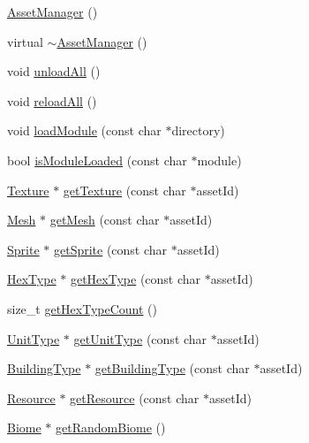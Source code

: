 \begin{DoxyCompactItemize}
\item 
\hyperlink{class_asset_manager_a750ae7b39b633fbb6594443aa3ca704b}{Asset\+Manager} ()
\item 
virtual \hyperlink{class_asset_manager_a9c89817cbf3516f1451c116e89f47d30}{$\sim$\+Asset\+Manager} ()
\item 
void \hyperlink{class_asset_manager_a34c0028e4cfb8e23642f161c1369cd56}{unload\+All} ()
\item 
void \hyperlink{class_asset_manager_ad6a75fed1cd03286eae6bb12a5a5d3d3}{reload\+All} ()
\item 
void \hyperlink{class_asset_manager_aeb708c02a513a57e9c1ac5351b3f2fa5}{load\+Module} (const char $\ast$directory)
\item 
bool \hyperlink{class_asset_manager_a2ef6d83cab64a6f6e57dd9b19c845318}{is\+Module\+Loaded} (const char $\ast$module)
\item 
\hyperlink{class_texture}{Texture} $\ast$ \hyperlink{class_asset_manager_ae6a8e90c1afdc608efea5e633a6da1a5}{get\+Texture} (const char $\ast$asset\+Id)
\item 
\hyperlink{class_mesh}{Mesh} $\ast$ \hyperlink{class_asset_manager_a3ef4d3c019dbccacbb234c335e84d4e9}{get\+Mesh} (const char $\ast$asset\+Id)
\item 
\hyperlink{class_sprite}{Sprite} $\ast$ \hyperlink{class_asset_manager_a3b3c93317e49e9bd0a9f13e25b3704b7}{get\+Sprite} (const char $\ast$asset\+Id)
\item 
\hyperlink{class_hex_type}{Hex\+Type} $\ast$ \hyperlink{class_asset_manager_a187aaa04aaf845d21fff965a39096c89}{get\+Hex\+Type} (const char $\ast$asset\+Id)
\item 
size\+\_\+t \hyperlink{class_asset_manager_a034d935d71b007a95209a795b8b22735}{get\+Hex\+Type\+Count} ()
\item 
\hyperlink{class_unit_type}{Unit\+Type} $\ast$ \hyperlink{class_asset_manager_a76b1d01c623bbc16f46fd7b51863422a}{get\+Unit\+Type} (const char $\ast$asset\+Id)
\item 
\hyperlink{class_building_type}{Building\+Type} $\ast$ \hyperlink{class_asset_manager_a38c5ac47c59edffad4bd370bcf139be7}{get\+Building\+Type} (const char $\ast$asset\+Id)
\item 
\hyperlink{class_resource}{Resource} $\ast$ \hyperlink{class_asset_manager_a96faef50e65cf928e3eecc3ee7af287c}{get\+Resource} (const char $\ast$asset\+Id)
\item 
\hyperlink{class_biome}{Biome} $\ast$ \hyperlink{class_asset_manager_a0baa9e0420ccf33634c0fc5091825fde}{get\+Random\+Biome} ()
\end{DoxyCompactItemize}
